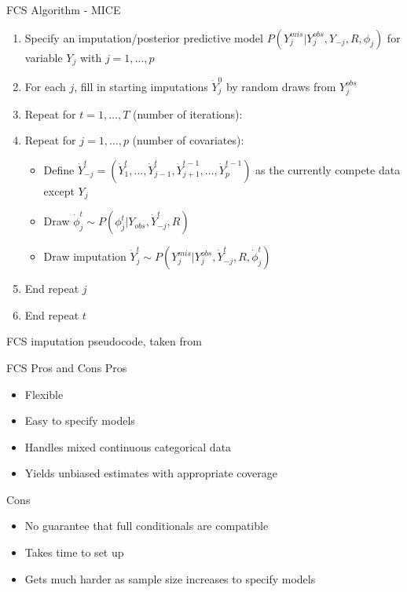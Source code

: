 \begin{frame}{FCS Algorithm - MICE}
 
 \begin{enumerate}
\item Specify an imputation/posterior predictive model $P(Y_{j}^{mis}|Y_{j}^{obs},Y_{-j},R,\phi_j)$ for variable $Y_j$ with $j=1,\dots,p$

\item For each $j$, fill in starting imputations $\dot{Y}_j ^{0}$ by random draws from $Y_{j}^{obs}$
\item Repeat for $t=1,\dots, T$ (number of iterations):
\item Repeat for $j=1,\dots,p$ (number of covariates):
\begin{itemize}
\item Define $\dot{Y}_{-j}^{t}=(\dot{Y}_1^{t},\dots,\dot{Y}_{j-1}^{t},\dot{Y}_{j+1}^{t-1},\dots,\dot{Y}_p^{t-1})$
as the currently compete data except $Y_j$
\item Draw $\dot{\phi}_j^{t}\sim P(\phi_j^t|Y_{obs},\dot{Y}_{-j}^{t},R)$
\item Draw imputation $\dot{Y}_{j}^{t}\sim P(Y_j^{mis}|Y_j^{obs},\dot{Y}_{-j}^{t},R,\dot{\phi}_j^{t})$

\end{itemize}
\item End repeat $j$
\item End repeat $t$
\end{enumerate}
FCS imputation pseudocode, taken from \cite{VanBuuren2012}
\end{frame}

\begin{frame}{FCS Pros and Cons}
Pros
 \begin{itemize}
  \item Flexible
  \item Easy to specify models
  \item Handles mixed continuous categorical data
  \item Yields unbiased estimates with appropriate coverage
 \end{itemize}

 Cons
 \begin{itemize}
  \item No guarantee that full conditionals are compatible
  \item Takes time to set up
  \item Gets much harder as sample size increases to specify models
 \end{itemize}

\end{frame}

